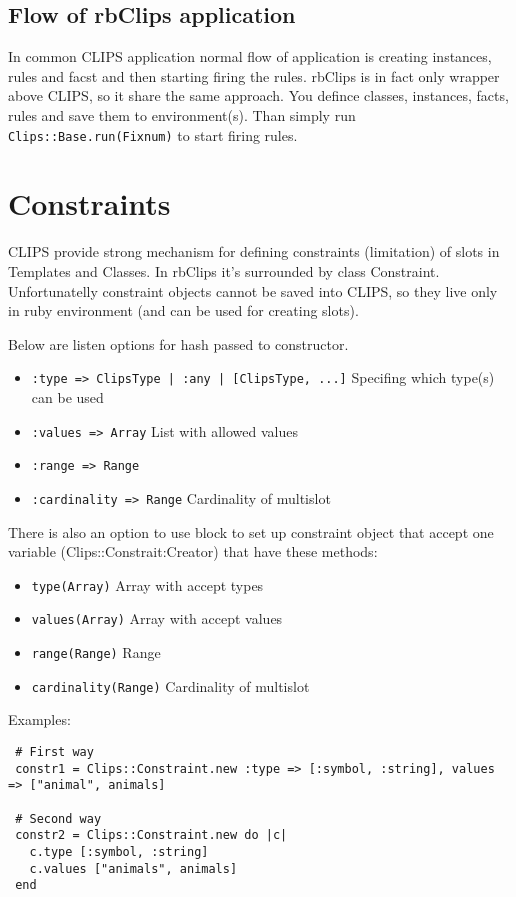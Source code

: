 \documentclass[a4paper,10pt]{article}
\begin{document}
\subsection{Flow of rbClips application}
In common CLIPS application normal flow of application is creating instances, rules and facst and then starting firing the rules. rbClips is in fact only wrapper above CLIPS, so it share the same approach. You defince classes, instances, facts, rules and save them to environment(s). Than simply run \texttt{Clips::Base.run(Fixnum)} to start firing rules.

\section{Constraints}
CLIPS provide strong mechanism for defining constraints (limitation) of slots in Templates and Classes. In rbClips it's surrounded by class Constraint. Unfortunatelly constraint objects cannot be saved into CLIPS, so they live only in ruby environment (and can be used for creating slots).

Below are listen options for hash passed to constructor.
\begin{itemize}
 \item \texttt{:type => ClipsType | :any | [ClipsType, ...]} Specifing which type(s) can be used
 \item \texttt{:values => Array} List with allowed values
 \item \texttt{:range => Range}
 \item \texttt{:cardinality => Range} Cardinality of multislot
\end{itemize}

There is also an option to use block to set up constraint object that accept one variable (Clips::Constrait:Creator) that have these methods:
\begin{itemize}
 \item \texttt{type(Array)} Array with accept types
 \item \texttt{values(Array)} Array with accept values
 \item \texttt{range(Range)} Range
 \item \texttt{cardinality(Range)} Cardinality of multislot
\end{itemize}

Examples:
\begin{verbatim}
 # First way
 constr1 = Clips::Constraint.new :type => [:symbol, :string], values => ["animal", animals]
 
 # Second way
 constr2 = Clips::Constraint.new do |c|
   c.type [:symbol, :string]
   c.values ["animals", animals]
 end
\end{verbatim}
\end{document}
